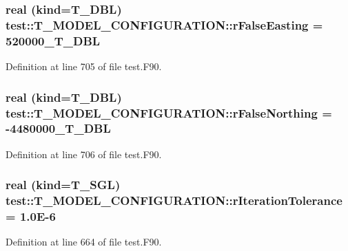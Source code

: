 \hypertarget{typetest_1_1_t___m_o_d_e_l___c_o_n_f_i_g_u_r_a_t_i_o_n_a4abadc5dca1e8ea35a61c30f678ff760}{
\subsubsection[{rFalseEasting}]{\setlength{\rightskip}{0pt plus 5cm}real (kind={\bf T\_\-DBL}) {\bf test::T\_\-MODEL\_\-CONFIGURATION::rFalseEasting} = 520000\_\-T\_\-DBL}}
\label{typetest_1_1_t___m_o_d_e_l___c_o_n_f_i_g_u_r_a_t_i_o_n_a4abadc5dca1e8ea35a61c30f678ff760}


Definition at line 705 of file test.F90.

\hypertarget{typetest_1_1_t___m_o_d_e_l___c_o_n_f_i_g_u_r_a_t_i_o_n_a4ec3e8079a450ecf9d3457d999a8f5b0}{
\subsubsection[{rFalseNorthing}]{\setlength{\rightskip}{0pt plus 5cm}real (kind={\bf T\_\-DBL}) {\bf test::T\_\-MODEL\_\-CONFIGURATION::rFalseNorthing} = -\/4480000\_\-T\_\-DBL}}
\label{typetest_1_1_t___m_o_d_e_l___c_o_n_f_i_g_u_r_a_t_i_o_n_a4ec3e8079a450ecf9d3457d999a8f5b0}


Definition at line 706 of file test.F90.

\hypertarget{typetest_1_1_t___m_o_d_e_l___c_o_n_f_i_g_u_r_a_t_i_o_n_aac119edf2f75f0db18a4dc4860cc5c19}{
\subsubsection[{rIterationTolerance}]{\setlength{\rightskip}{0pt plus 5cm}real (kind={\bf T\_\-SGL}) {\bf test::T\_\-MODEL\_\-CONFIGURATION::rIterationTolerance} = 1.0E-\/6}}
\label{typetest_1_1_t___m_o_d_e_l___c_o_n_f_i_g_u_r_a_t_i_o_n_aac119edf2f75f0db18a4dc4860cc5c19}


Definition at line 664 of file test.F90.

